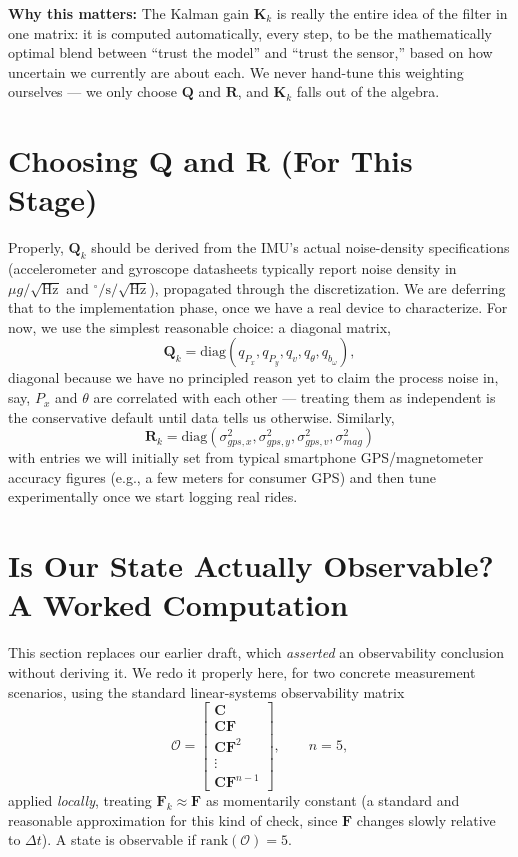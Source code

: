 \documentclass[11pt,a4paper]{article}
\newcommand{\note}[1]{\par\noindent\textbf{Why this matters:} #1\par}
\begin{document}
\note{The Kalman gain $\mathbf{K}_k$ is really the entire idea of the filter in one matrix: it is computed automatically, every step, to be the mathematically optimal blend between ``trust the model'' and ``trust the sensor,'' based on how uncertain we currently are about each. We never hand-tune this weighting ourselves --- we only choose $\mathbf{Q}$ and $\mathbf{R}$, and $\mathbf{K}_k$ falls out of the algebra.}

\section{Choosing $\mathbf{Q}$ and $\mathbf{R}$ (For This Stage)}

Properly, $\mathbf{Q}_k$ should be derived from the IMU's actual noise-density specifications (accelerometer and gyroscope datasheets typically report noise density in $\mu g/\sqrt{\text{Hz}}$ and $^\circ/\text{s}/\sqrt{\text{Hz}}$), propagated through the discretization. We are deferring that to the implementation phase, once we have a real device to characterize. For now, we use the simplest reasonable choice: a diagonal matrix,
\begin{equation}
    \mathbf{Q}_k = \mathrm{diag}(q_{P_x}, q_{P_y}, q_v, q_\theta, q_{b_\omega}),
\end{equation}
diagonal because we have no principled reason yet to claim the process noise in, say, $P_x$ and $\theta$ are correlated with each other --- treating them as independent is the conservative default until data tells us otherwise. Similarly,
\begin{equation}
    \mathbf{R}_k = \mathrm{diag}(\sigma_{gps,x}^2, \sigma_{gps,y}^2, \sigma_{gps,v}^2, \sigma_{mag}^2)
\end{equation}
with entries we will initially set from typical smartphone GPS/magnetometer accuracy figures (e.g., a few meters for consumer GPS) and then tune experimentally once we start logging real rides.

\section{Is Our State Actually Observable? A Worked Computation}

This section replaces our earlier draft, which \emph{asserted} an observability conclusion without deriving it. We redo it properly here, for two concrete measurement scenarios, using the standard linear-systems observability matrix
\begin{equation}
    \mathcal{O} = \begin{bmatrix} \mathbf{C} \\ \mathbf{C}\mathbf{F} \\ \mathbf{C}\mathbf{F}^2 \\ \vdots \\ \mathbf{C}\mathbf{F}^{n-1} \end{bmatrix}, \qquad n = 5,
\end{equation}
applied \emph{locally}, treating $\mathbf{F}_k \approx \mathbf{F}$ as momentarily constant (a standard and reasonable approximation for this kind of check, since $\mathbf{F}$ changes slowly relative to $\Delta t$). A state is observable if $\mathrm{rank}(\mathcal{O}) = 5$.
\end{document}
